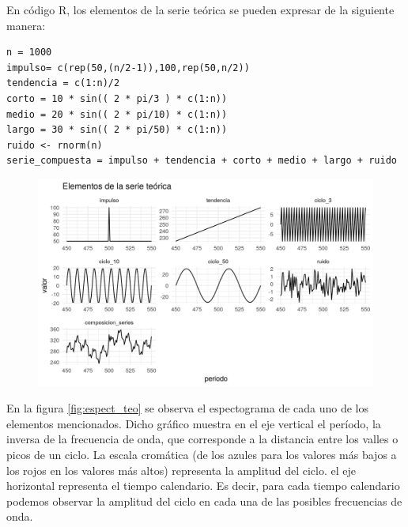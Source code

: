\documentclass[a4paper]{article}
\begin{document}
En código R, los elementos de la serie teórica se pueden expresar de la siguiente manera:

\begin{lstlisting}
n = 1000
impulso= c(rep(50,(n/2-1)),100,rep(50,n/2))
tendencia = c(1:n)/2
corto = 10 * sin(( 2 * pi/3 ) * c(1:n))
medio = 20 * sin(( 2 * pi/10) * c(1:n))
largo = 30 * sin(( 2 * pi/50) * c(1:n))
ruido <- rnorm(n)
serie_compuesta = impulso + tendencia + corto + medio + largo + ruido
\end{lstlisting}


\begin{figure}[H]
	\centering
	\includegraphics[width=\linewidth]{serie_teorica.PNG}
	\caption{} \label{fig:serie_teorica}
\end{figure}

En la figura \ref{fig:espect_teo} se observa el espectograma de cada uno de los elementos mencionados. Dicho gráfico muestra en el eje vertical el período, la inversa de la frecuencia de onda, que corresponde a la distancia entre los valles o picos de un ciclo. La escala cromática (de los azules para los valores más bajos a los rojos en los valores más altos) representa la amplitud del ciclo. el eje horizontal representa el tiempo calendario. Es decir, para cada tiempo calendario podemos observar la amplitud del ciclo en cada una de las posibles frecuencias de onda. 
\end{document}
